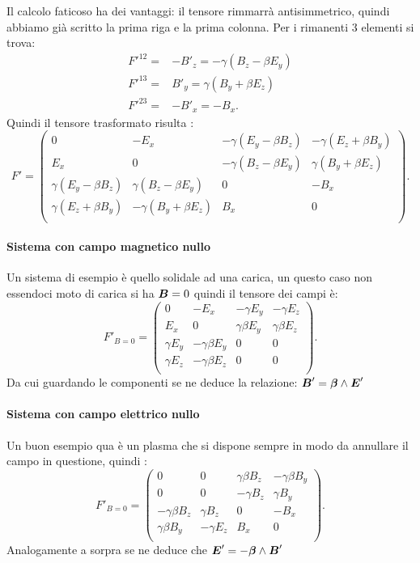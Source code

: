 Il calcolo faticoso ha dei vantaggi: il tensore rimmarrà antisimmetrico, quindi abbiamo già scritto la prima riga e la prima colonna. Per i rimanenti 3 elementi si trova:
\begin{align*}
	F'^{12}=& -B'_{z}= -\gamma\left(B_{z} -\beta E_{y} \right)\\ 
	F'^{13}=& B'_{y}= \gamma\left( B_{y}+\beta E_{z} \right)\\ 
	F'^{23}=& -B'_{x}= -B_{x}
.\end{align*}
Quindi il tensore trasformato risulta :
\[
F'=
\left( 
\begin{array}{cccc}
	0 				&	 -E_{x} 			& 	-\gamma ( E_{y}- \beta B_{z})  	&	 -\gamma (E_{z}+\beta B_{y}) \\   
	E_{x} 				&	 0 				& 	-\gamma ( B_{z}-\beta E_{y} )  	& 	\gamma ( B_{y}+\beta E_{z} )  \\
	\gamma ( E_{y}- \beta B_{z} )  	&	 \gamma ( B_{z}-\beta E_{y} )  	&	 0 				&	 -B_{x} \\
	\gamma ( E_{z}+\beta B_{y} )  	& 	-\gamma ( B_{y}+\beta E_{z} )  	& 	B_{x} 				& 	0 \\
	\end{array}
	\right) 
.\] 
\paragraph{Sistema con campo magnetico nullo}%
Un sistema di esempio è quello solidale ad una carica, un questo caso non essendoci moto di carica si ha $\boldsymbol{B}=0$ quindi il tensore dei campi è:
\[
F'_{B=0}=
\left( 
\begin{array}{cccc}
	0 & -E_{x} & -\gamma E_{y} & -\gamma E_{z} \\   
	E_{x} & 0 & \gamma\beta E_{y} & \gamma\beta E_{z} \\
	\gamma E_{y} & -\gamma\beta E_{y} & 0 & 0 \\
	\gamma E_{z} & -\gamma\beta E_{z} & 0 & 0 \\
\end{array}
\right) 
.\]
Da cui guardando le componenti se ne deduce la relazione: $ \boldsymbol{B}'=\boldsymbol{\beta}\wedge \boldsymbol{E}' $
\paragraph{Sistema con campo elettrico nullo}%
Un buon esempio qua è un plasma che si dispone sempre in modo da annullare il campo in questione, quindi :
\[
F'_{B=0}=
\left( 
\begin{array}{cccc}
	0 & 0 & \gamma\beta B_{z} & -\gamma\beta B_{y} \\   
	0 & 0 & -\gamma B_{z} & \gamma B_{y} \\
	-\gamma\beta B_{z} & \gamma B_{z} & 0 & -B_{x} \\
	\gamma\beta B_{y} & -\gamma E_{z} & B_{x} & 0 \\
\end{array}
\right) 
.\] 
Analogamente a sorpra se ne deduce che $\boldsymbol{E}'=-\boldsymbol{\beta}\wedge \boldsymbol{B}' $

